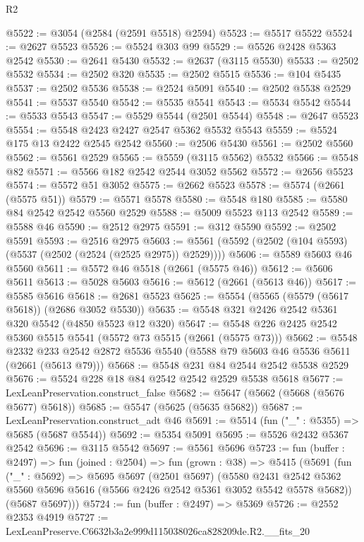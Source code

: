 \begin{lexlean}{R2}
\begin{coremodule}
@5522 := @3054 (@2584 (@2591 @5518) @2594)
@5523 := @5517 @5522
@5524 := @2627 @5523
@5526 := @5524 @303 @99
@5529 := @5526 @2428 @5363 @2542
@5530 := @2641 @5430
@5532 := @2637 (@3115 @5530)
@5533 := @2502 @5532
@5534 := @2502 @320
@5535 := @2502 @5515
@5536 := @104 @5435
@5537 := @2502 @5536
@5538 := @2524 @5091
@5540 := @2502 @5538 @2529
@5541 := @5537 @5540
@5542 := @5535 @5541
@5543 := @5534 @5542
@5544 := @5533 @5543
@5547 := @5529 @5544 (@2501 @5544)
@5548 := @2647 @5523
@5554 := @5548 @2423 @2427 @2547 @5362 @5532 @5543
@5559 := @5524 @175 @13 @2422 @2545 @2542
@5560 := @2506 @5430
@5561 := @2502 @5560
@5562 := @5561 @2529
@5565 := @5559 (@3115 @5562) @5532
@5566 := @5548 @82
@5571 := @5566 @182 @2542 @2544 @3052 @5562
@5572 := @2656 @5523
@5574 := @5572 @51 @3052
@5575 := @2662 @5523
@5578 := @5574 (@2661 (@5575 @51))
@5579 := @5571 @5578
@5580 := @5548 @180
@5585 := @5580 @84 @2542 @2542 @5560 @2529
@5588 := @5009 @5523 @113 @2542
@5589 := @5588 @46
@5590 := @2512 @2975
@5591 := @312 @5590
@5592 := @2502 @5591
@5593 := @2516 @2975
@5603 := @5561 (@5592 (@2502 (@104 @5593) (@5537 (@2502 (@2524 (@2525 @2975)) @2529))))
@5606 := @5589 @5603 @46 @5560
@5611 := @5572 @46 @5518 (@2661 (@5575 @46))
@5612 := @5606 @5611
@5613 := @5028 @5603
@5616 := @5612 (@2661 (@5613 @46))
@5617 := @5585 @5616
@5618 := @2681 @5523
@5625 := @5554 (@5565 (@5579 (@5617 @5618)) (@2686 @3052 @5530))
@5635 := @5548 @321 @2426 @2542 @5361 @320 @5542 (@4850 @5523 @12 @320)
@5647 := @5548 @226 @2425 @2542 @5360 @5515 @5541 (@5572 @73 @5515 (@2661 (@5575 @73)))
@5662 := @5548
    @2332
    @233
    @2542
    @2872
    @5536
    @5540
    (@5588 @79 @5603 @46 @5536 @5611 (@2661 (@5613 @79)))
@5668 := @5548 @231 @84 @2544 @2542 @5538 @2529
@5676 := @5524 @228 @18 @84 @2542 @2542 @2529 @5538 @5618
@5677 := LexLeanPreservation.construct_false
@5682 := @5647 (@5662 (@5668 (@5676 @5677) @5618))
@5685 := @5547 (@5625 (@5635 @5682))
@5687 := LexLeanPreservation.construct_adt @46
@5691 := @5514 (fun ("_" : @5355) => @5685 (@5687 @5544))
@5692 := @5354 @5091
@5695 := @5526 @2432 @5367 @2542
@5696 := @3115 @5542
@5697 := @5561 @5696
@5723 := fun (buffer : @2497) =>
  fun (joined : @2504) =>
  fun (grown : @38) =>
  @5415
    (@5691
      (fun ("_" : @5692) =>
      @5695
        @5697
        (@2501 @5697)
        (@5580
          @2431
          @2542
          @5362
          @5560
          @5696
          @5616
          (@5566 @2426 @2542 @5361 @3052 @5542 @5578 @5682))
        (@5687 @5697)))
@5724 := fun (buffer : @2497) => @5369
@5726 := @2552 @2353 @4919
@5727 := LexLeanPreserve.C6632b3a2e999d115038026ca828209de.R2.__fits_20

\end{coremodule}
\end{lexlean}
